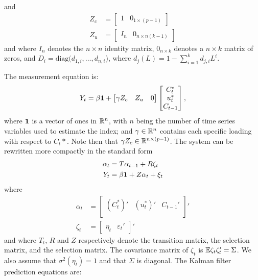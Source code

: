 and
\begin{equation}
	\begin{aligned}
		Z_c & = \begin{bmatrix}
			1 & 0_{1\times(p-1)}
		\end{bmatrix}\\
		Z_u & = \begin{bmatrix}
			I_n & 0_{n\times n (k-1)}
		\end{bmatrix}
	\end{aligned}
\end{equation}
and where $I_n$ denotes the $n\times n$ identity matrix, $0_{n\times k}$ denotes a $n\times k$ matrix of zeros, and $D_i = \text{diag}(d_{1,i}, \ldots, d_{n,i}$), where $d_j(L) = 1- \sum_{i=1}^k d_{j,i} L^i$.

The measurement equation is:
\begin{equation}
	Y_t = \beta \mathbf{1} + \begin{bmatrix}
		\gamma Z_c & Z_u & 0 
	\end{bmatrix}
	\begin{bmatrix}
		C_t^\ast\\u_t^\ast \\ C_{t-1}
	\end{bmatrix},
\end{equation}
where $\mathbf{1}$ is a vector of ones in $\mathbb{R}^n$, with $n$ being the number of time series variables used to estimate the index; and $\gamma\in \mathbb{R}^n$ contains each specific loading with respect to $C_t\ast$. Note then that $\gamma Z_c\in \mathbb{R}^{n\times (p-1)}$. The system can be rewritten more compactly in the standard form
\begin{align}
	\alpha_t & = T \alpha_{t-1} + R\zeta_t \label{eq:alpha}\\
	Y_t & = \beta \mathbf{1} + Z\alpha_t + \xi_t\label{eq:Y}
\end{align}
where
\begin{equation}
	\begin{aligned}
		\alpha_t &= \begin{bmatrix}
			(C_t^\ast)' & (u_t^\ast)' & C_{t-1}'\\
		\end{bmatrix}'\\
		\zeta_t & = \begin{bmatrix}
			\eta_t & \varepsilon_t'
		\end{bmatrix}'
	\end{aligned}
\end{equation}
and where $T_t$, $R$ and $Z$ respectively denote the transition matrix, the selection matrix, and the selection matrix. The covariance matrix of $\zeta_t$ is $\mathbb{E}\zeta_t\zeta_t'=\Sigma$. We also assume that $\sigma^2(\eta_t) = 1$ and that $\Sigma$ is diagonal. The Kalman filter prediction equations are: 
